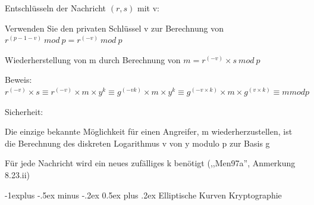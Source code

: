 \documentclass[a4paper]{article}
\makeatletter
\renewcommand{\subsection}{\@startsection{subsection}{2}{0mm}%
 {-1explus -.5ex minus -.2ex}%
 {0.5ex plus .2ex}%
 {\normalfont\normalsize\bfseries}}
\makeatother
\begin{document}
\begin{multicols}{3}
\begin{itemize*}
\begin{itemize*}
            \end{itemize*}
            \item Entschlüsseln der Nachricht $(r,s)$ mit v:
            \begin{itemize*}
                  \item Verwenden Sie den privaten Schlüssel v zur Berechnung von $r^{(p-1-v)}\ mod\ p=r^{(-v)}\ mod\ p$
                  \item Wiederherstellung von m durch Berechnung von $m=r^{(-v)}\times s\ mod\ p$
                  \item Beweis: $r^{(-v)}\times s\equiv r^{(-v)} \times m \times y^k\equiv g^{(-vk)}\times m \times y^k\equiv g^{(-v \times k)} \times m\times g^{(v \times k)} \equiv m mod p$
            \end{itemize*}
            \item Sicherheit:
            \begin{itemize*}
                  \item Die einzige bekannte Möglichkeit für einen Angreifer, m wiederherzustellen, ist die Berechnung des diskreten Logarithmus v von y modulo p zur Basis g
                  \item Für jede Nachricht wird ein neues zufälliges k benötigt (,,Men97a'', Anmerkung 8.23.ii)
            \end{itemize*}
      \end{itemize*}


      \subsection{Elliptische Kurven
            Kryptographie}


\end{multicols}
\end{document}
